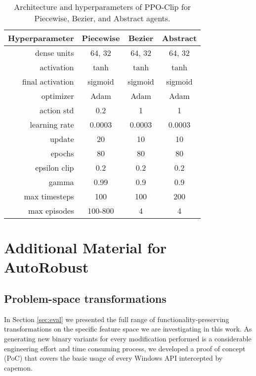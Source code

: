 \begin{table}[h]
\centering
\renewcommand*{\arraystretch}{1.05}
\begin{tabular}{|r|c|c|c|}
\toprule
\textbf{Hyperparameter} &\bf Piecewise &\bf Bezier &\bf Abstract \\
\midrule
dense units & 64, 32 & 64, 32 & 64, 32 \\
activation & tanh & tanh & tanh\\
final activation & sigmoid & sigmoid & sigmoid\\
optimizer & Adam & Adam & Adam\\
action std & 0.2 & 1 & 1\\
learning rate & 0.0003 & 0.0003 & 0.0003\\
update & 20 & 10 & 10\\
epochs & 80 & 80 & 80\\
epsilon clip & 0.2 & 0.2 & 0.2\\
gamma & 0.99 & 0.9 & 0.9\\
max timesteps & 100 & 100 & 200\\
max episodes & 100-800 & 4 & 4\\
\bottomrule
\end{tabular}
\caption{Architecture and hyperparameters of PPO-Clip for Piecewise, Bezier, and Abstract agents.}
\label{appendix:hyper}
\end{table}

\chapter{Additional Material for AutoRobust}\label{apx:autorobust}

\section{Problem-space transformations}
\label{app:transformations}
In Section \ref{sec:eval} we presented the full range of functionality-preserving transformations on the specific feature space we are investigating in this work.
As generating new binary variants for every modification performed is a considerable engineering effort and time consuming process, we developed a proof of concept (PoC) that covers the basic usage of every Windows API intercepted by capemon.

